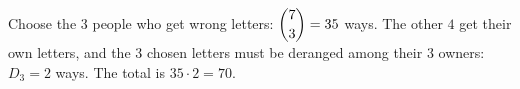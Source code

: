 Choose the $3$ people who get wrong letters: $\dbinom73=35$ ways. The other $4$ get their own letters, and the $3$ chosen letters must be deranged among their $3$ owners: $D_3=2$ ways. The total is $35\cdot2=\boxed{70}$.
